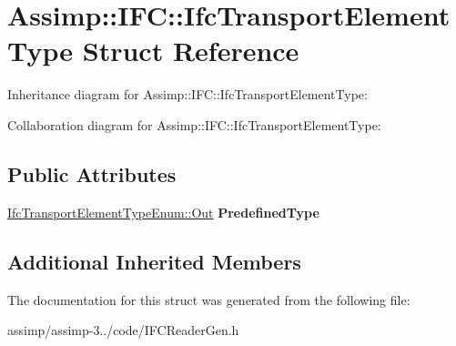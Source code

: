 \hypertarget{struct_assimp_1_1_i_f_c_1_1_ifc_transport_element_type}{\section{Assimp\+:\+:I\+F\+C\+:\+:Ifc\+Transport\+Element\+Type Struct Reference}
\label{struct_assimp_1_1_i_f_c_1_1_ifc_transport_element_type}
}


Inheritance diagram for Assimp\+:\+:I\+F\+C\+:\+:Ifc\+Transport\+Element\+Type\+:


Collaboration diagram for Assimp\+:\+:I\+F\+C\+:\+:Ifc\+Transport\+Element\+Type\+:
\subsection*{Public Attributes}
\begin{DoxyCompactItemize}
\item 
\hypertarget{struct_assimp_1_1_i_f_c_1_1_ifc_transport_element_type_ae9bc88ca5866e30d479eef6fabafd04a}{\hyperlink{classboost_1_1shared__ptr}{Ifc\+Transport\+Element\+Type\+Enum\+::\+Out} {\bfseries Predefined\+Type}}\label{struct_assimp_1_1_i_f_c_1_1_ifc_transport_element_type_ae9bc88ca5866e30d479eef6fabafd04a}

\end{DoxyCompactItemize}
\subsection*{Additional Inherited Members}


The documentation for this struct was generated from the following file\+:\begin{DoxyCompactItemize}
\item 
assimp/assimp-\/3../code/I\+F\+C\+Reader\+Gen.\+h\end{DoxyCompactItemize}
